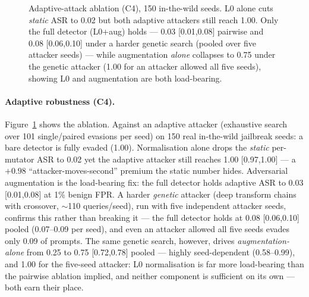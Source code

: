 \documentclass[11pt]{article}
\begin{document}
\begin{figure}[t]
\centering
{}
\caption{Adaptive-attack ablation (C4), 150 in-the-wild seeds. L0 alone cuts \emph{static} ASR to 0.02
but both adaptive attackers still reach 1.00. Only the full detector (L0+aug) holds --- 0.03 [0.01,0.08]
pairwise and 0.08 [0.06,0.10] under a harder genetic search (pooled over five attacker seeds) --- while
augmentation \emph{alone} collapses to 0.75 under the genetic attacker (1.00 for an attacker allowed all
five seeds), showing L0 and augmentation are both load-bearing.}
\label{fig:adaptive}
\end{figure}

\paragraph{Adaptive robustness (C4).} Figure~\ref{fig:adaptive} shows the ablation. Against an adaptive attacker (exhaustive search over 101
single/paired evasions per seed) on 150 real in-the-wild jailbreak seeds: a bare detector is fully
evaded (1.00). Normalisation alone drops the \emph{static} per-mutator ASR to 0.02 yet the adaptive
attacker still reaches 1.00 [0.97,1.00] --- a $+0.98$ ``attacker-moves-second'' premium the static
number hides. Adversarial augmentation is the load-bearing fix: the full detector holds adaptive ASR
to 0.03 [0.01,0.08] at 1\% benign FPR. A harder \emph{genetic} attacker (deep transform chains with
crossover, $\sim$110 queries/seed), run with five independent attacker seeds, confirms this rather than
breaking it --- the full detector holds at 0.08 [0.06,0.10] pooled (0.07--0.09 per seed), and even an
attacker allowed all five seeds evades only 0.09 of prompts. The same genetic search, however, drives
\emph{augmentation-alone} from 0.25 to 0.75 [0.72,0.78] pooled --- highly seed-dependent (0.58--0.99), and
1.00 for the five-seed attacker: L0 normalisation is far more load-bearing than the pairwise ablation
implied, and neither component is sufficient on its own --- both earn their place.
\end{document}
